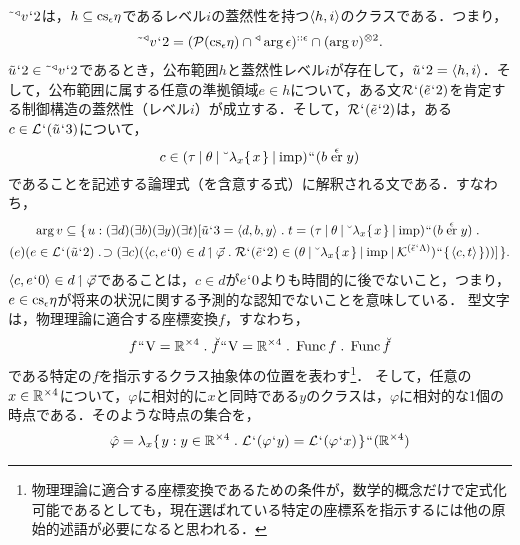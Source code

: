 $ \tilde{\:\:}{^\triangleleft}v{\mspace{1mu}{`}\mspace{1mu}} 2 $は，$ h\subseteq\mathrm{cs}_{\epsilon}\eta $であるレベル$i$の蓋然性を持つ$\langle h,i \rangle$のクラスである．つまり，
\begin{align}
    \tilde{\:\:}{^\triangleleft}v{\mspace{1mu}{`}\mspace{1mu}} 2 = (\mathcal{P}(\mathrm{cs}_{\epsilon}\eta)\cap{^\triangleleft}\arg\epsilon)^{::\epsilon}\cap(\arg v)^{\otimes 2}.
\end{align}
$ \tilde{u}{\mspace{1mu}{`}\mspace{1mu}} 2\in \tilde{\:\:}{^\triangleleft}v{\mspace{1mu}{`}\mspace{1mu}} 2 $であるとき，公布範囲$h$と蓋然性レベル$i$が存在して，$\tilde{u}{\mspace{1mu}{`}\mspace{1mu}} 2 = \langle h,i \rangle$．そして，公布範囲に属する任意の準拠領域$e\in h$について，ある文$ \mathcal{R}{\mspace{1mu}{`}\mspace{1mu}}(\tilde{e}{\mspace{1mu}{`}\mspace{1mu}} 2) $を肯定する制御構造の蓋然性（レベル$i$）が成立する．そして，$ \mathcal{R}{\mspace{1mu}{`}\mspace{1mu}}(\tilde{e}{\mspace{1mu}{`}\mspace{1mu}} 2) $は，ある$ c\in \mathcal{L}{\mspace{1mu}{`}\mspace{1mu}}(\tilde{u}{\mspace{1mu}{`}\mspace{1mu}} 3) $について，
\[
    c\in(\tau\mathbin{\mid}\theta\mathbin{\mid}\breve{\:\:}\lambda_x\{\mspace{2mu}x\mspace{2mu}\}\mathbin{\mid}\mathrm{imp}){\mspace{1mu}{``}\mspace{1mu}} (b\stackrel{\epsilon}{\mathrm{er}}y)
\]
であることを記述する論理式（を含意する式）に解釈される文である．すなわち，
\begin{multline}
    \arg v \subseteq \classab{u:(\exists d)(\exists b)(\exists y)(\exists t)[
        \tilde{u}\fap 3 = \orp{d,b,y}\con{1}
        t = (\tau\resl\theta\resl\brevel{\lambda_x\classab{x}}\resl\mathrm{imp})\img (b\stackrel{\epsilon}{\mathrm{er}}y)\con{1}\\
        (e)(e\in \mathcal{L}\fap(\tilde{u}\fap 2)\case{1}{1}{0}
            (\exists c)(\orp{c,e\fap 0}\in d\uphl\vec{\varphi}\con{1}
                \mathcal{R}\fap(\tilde{e}\fap 2)\in (\theta\resl\brevel{\lambda_x\classab{x}}\resl\mathrm{imp}\resl \mathcal{K}^{(\breve{\epsilon}\fap\Lambda)})
                \img\classab{\orp{ c,t }}
            )
        )
    ]
    }.
\end{multline}
$ \langle c,e{\mspace{1mu}{`}\mspace{1mu}} 0 \rangle\in d\mathbin{\upharpoonleft}\vec{\varphi} $であることは，$ c\in d $が$ e{\mspace{1mu}{`}\mspace{1mu}} 0 $よりも時間的に後でないこと，つまり，$e\in\mathrm{cs}_{\epsilon}\eta$が将来の状況に関する予測的な認知でないことを意味している．
型文字\kagi{$ \varphi $}は，物理理論に適合する座標変換$f$，すなわち，
\[
    f\img\univ = \timex{\mathbb{R}}{4}\con{1}\breve{f}\img\univ = \timex{\mathbb{R}}{4}\con{1}\func f\con{1}\func\breve{f}
\]
である特定の$f$を指示するクラス抽象体の位置を表わす\footnote{物理理論に適合する座標変換であるための条件が，数学的概念だけで定式化可能であるとしても，現在選ばれている特定の座標系を指示するには他の原始的述語が必要になると思われる．}．
そして，任意の$ x\in \mathbb{R}^{\times 4} $について，$ \varphi $に相対的に$x$と同時である$y$のクラスは，$ \varphi $に相対的な1個の時点である．そのような時点の集合を，
\begin{align*}
    \hat{\varphi} = \lambda_x\classab{y:y\in\timex{\mathbb{R}}{4}\con{1}\mathcal{L}\fap(\varphi \fap y)=\mathcal{L}\fap(\varphi \fap x)}\img(\timex{\mathbb{R}}{4})
\end{align*}
